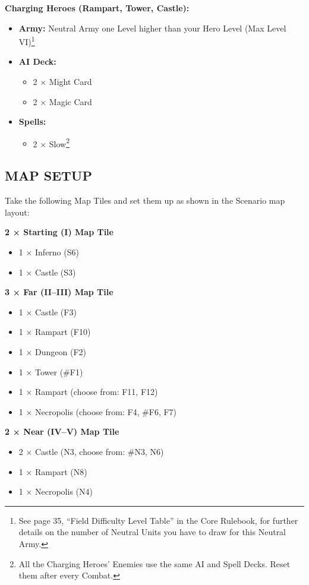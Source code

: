 \begin{multicols*}{2}
\textbf{Charging Heroes (Rampart, Tower, Castle):}
\begin{itemize}
    \item \textbf{Army:}
       Neutral Army one Level higher than your Hero Level (Max Level VI)\footnote{See page 35, ``Field Difficulty Level Table'' in the Core Rulebook, for further details on the number of Neutral Units you have to draw for this Neutral Army.}
    \item \textbf{AI Deck:}
    \begin{itemize}
        \item 2 ×  Might Card
        \item 2 ×  Magic Card
    \end{itemize}
    \item \textbf{Spells:}
    \begin{itemize}
        \item 2 × Slow\footnote{All the Charging Heroes' Enemies use the same AI and Spell Decks. Reset them after every Combat.}
    \end{itemize}
\end{itemize}

\subsection*{\MakeUppercase{Map Setup}}

Take the following Map Tiles and set them up as shown in the Scenario map layout:

\textbf{2 × Starting (I) Map Tile}
\begin{itemize}
  \item 1 × Inferno (S6)
  \item 1 × Castle (S3)
\end{itemize}

\textbf{3 × Far (II--III) Map Tile}
\begin{itemize}
  \item 1 × Castle (F3)
  \item 1 × Rampart (F10)
  \item 1 × Dungeon (F2)
  \item 1 × Tower (\#F1)
  \item 1 × Rampart (choose from: F11, F12)
  \item 1 × Necropolis (choose from: F4, \#F6, F7)
\end{itemize}

\textbf{2 × Near (IV--V) Map Tile}
\begin{itemize}
  \item 2 × Castle (N3, choose from: \#N3, N6)
  \item 1 × Rampart (N8)
  \item 1 × Necropolis (N4)
\end{itemize}


\end{multicols*}
